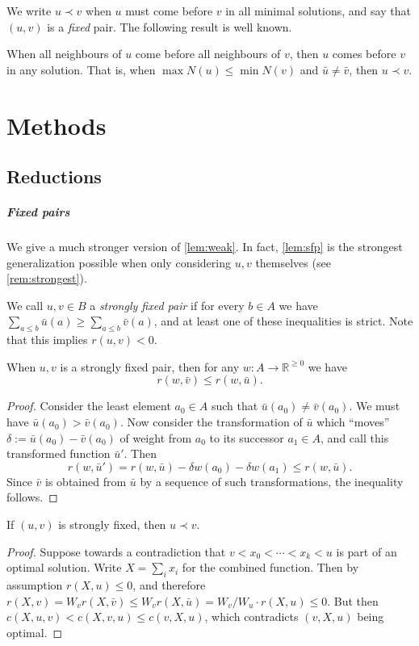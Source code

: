 \documentclass[a4paper,UKenglish,cleveref, autoref, thm-restate]{lipics-v2021}
\renewcommand{\b}{\prec}
\begin{document}
We write $u\b v$ when $u$ must come before $v$ in all minimal solutions, and say that $(u, v)$
is a \emph{fixed} pair. The following result is well known.

\begin{observation}\label{lem:weak}
  When all neighbours of $u$ come before all neighbours of $v$, then $u$ comes
  before $v$ in any solution.
  That is, when $\max N(u) \leq \min N(v)$ and $\bar u\neq \bar v$, then $u\b v$.
\end{observation}

\section{Methods}
\subsection{Reductions}
\subparagraph{Fixed pairs}
We give a much stronger version of \cref{lem:weak}. In fact, \cref{lem:sfp} is the strongest
generalization possible when only considering $u, v$ themselves (see \cref{rem:strongest}).
\begin{definition}
    We call $u, v \in B$ a \emph{strongly fixed pair} if for every $b \in A$ we have ${\sum_{a
    \leq b} \bar u(a) \geq \sum_{a \leq b} \bar v(a)}$, and at least one of these inequalities
    is strict. Note that this implies $r(u, v) < 0$.
\end{definition}
\begin{lemma}\label{lem:sfp} When $u, v$ is a strongly fixed pair,
    then for any $w: A\to \mathbb R^{\geq 0}$ we have 
    \[
        r(w, \bar v) \leq r(w, \bar u).
    \]
\end{lemma}
\begin{proof}
    Consider the least element $a_0 \in A$ such that $\bar u(a_0) \neq
    \bar v(a_0)$. We must have $\bar u(a_0) > \bar v(a_0)$. Now consider the transformation of
    $\bar u$ which ``moves'' $\delta := \bar u(a_0) - \bar v(a_0)$ of weight from $a_0$ to its
    successor $a_1 \in A$, and call this transformed function $\bar u'$. Then
    \[
        r(w, \bar u') = r(w, \bar u) - \delta w(a_0) - \delta w(a_1) \leq r(w, \bar u).
    \]
    Since $\bar v$ is obtained from $\bar u$ by a sequence of such transformations,
    the inequality follows.
\end{proof}
\begin{lemma}\label{lem:sfimplf}
    If $(u, v)$ is strongly fixed, then $u \b v$.
\end{lemma}
\begin{proof}
    Suppose towards a contradiction that $v < x_0 < \cdots < x_k < u$ is part of an optimal
    solution. Write $X = \sum_i x_i$ for the combined function. Then by assumption $r(X, u)
    \leq 0$, and therefore $r(X, v) = W_v r(X, \bar v) \leq W_v r(X, \bar u) = W_v / W_u \cdot
    r(X, u) \leq 0$. But then $c(X, u, v) < c(X, v, u)\leq c(v, X, u)$, which
    contradicts $(v,X,u)$ being optimal.
\end{proof}
\end{document}
